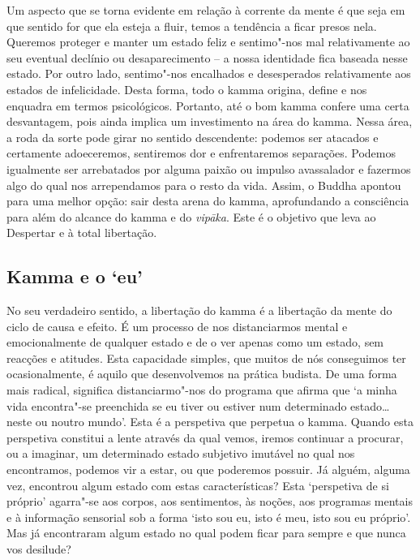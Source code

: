 Um aspecto que se torna evidente em relação à corrente da mente é que seja em
que sentido for que ela esteja a fluir, temos a tendência a ficar presos nela.
Queremos proteger e manter um estado feliz e sentimo"-nos mal relativamente ao
seu eventual declínio ou desaparecimento -- a nossa identidade fica baseada
nesse estado. Por outro lado, sentimo"-nos encalhados e desesperados
relativamente aos estados de infelicidade. Desta forma, todo o kamma origina,
define e nos enquadra em termos psicológicos. Portanto, até o bom kamma confere
uma certa desvantagem, pois ainda implica um investimento na área do kamma.
Nessa área, a roda da sorte pode girar no sentido descendente: podemos ser
atacados e certamente adoeceremos, sentiremos dor e enfrentaremos separações.
Podemos igualmente ser arrebatados por alguma paixão ou impulso avassalador e
fazermos algo do qual nos arrependamos para o resto da vida. Assim, o Buddha
apontou para uma melhor opção: sair desta arena do kamma, aprofundando a
consciência para além do alcance do kamma e do \emph{vipāka}. Este é o objetivo
que leva ao Despertar e à total libertação.

\subsection{Kamma e o `eu\kern -0.5pt'}

No seu verdadeiro sentido, a libertação do kamma é a libertação da mente do
ciclo de causa e efeito. É um processo de nos distanciarmos mental e
emocionalmente de qualquer estado e de o ver apenas como um estado, sem reacções
e atitudes. Esta capacidade simples, que muitos de nós conseguimos ter
ocasionalmente, é aquilo que desenvolvemos na prática budista. De uma forma mais
radical, significa distanciarmo"-nos do programa que afirma que `a minha vida
encontra"-se preenchida se eu tiver ou estiver num determinado estado\ldots{}
neste ou noutro mundo'. Esta é a perspetiva que perpetua o kamma. Quando esta
perspetiva constitui a lente através da qual vemos, iremos continuar a procurar,
ou a imaginar, um determinado estado subjetivo imutável no qual nos encontramos,
podemos vir a estar, ou que poderemos possuir. Já alguém, alguma vez, encontrou
algum estado com estas características? Esta `perspetiva de si próprio'
agarra"-se aos corpos, aos sentimentos, às noções, aos programas mentais e à
informação sensorial sob a forma `isto sou eu, isto é meu, isto sou eu próprio'.
Mas já encontraram algum estado no qual podem ficar para sempre e que nunca vos
desilude?

